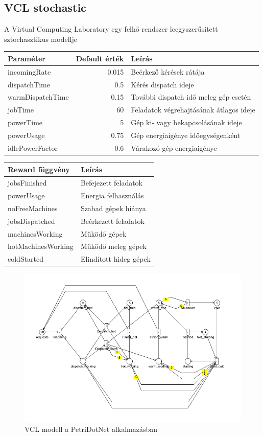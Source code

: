 \subsection{VCL stochastic}

A Virtual Computing Laboratory egy felhő rendszer leegyszerűsített sztochasztikus modellje
\begin{center}
	\begin{tabular}{lrl}
		\textbf{\textbf{Paraméter}} & \textbf{Default érték} & \textbf{Leírás} \\
		\hline
		incomingRate & 0.015 & Beérkező kérések rátája\\
		dispatchTime & 0.5 & Kérés dispatch ideje\\
		warmDispatchTime & 0.15 & További dispatch idő meleg gép esetén\\
		jobTime & 60 & Feladatok végrehajtásának átlagos ideje\\
		powerTime & 5 & Gép ki- vagy bekapcsolásának ideje\\
		powerUsage & 0.75 & Gép energiaigénye időegységenként\\
		idlePowerFactor & 0.6 & Várakozó gép energiaigénye\\
	\end{tabular}
	\quad
	\begin{tabular}{ll}
		\textbf{\textbf{Reward függvény}} & \textbf{Leírás}\\
		\hline
		jobsFinished & Befejezett feladatok\\
		powerUsage & Energia felhasználás\\
		noFreeMachines & Szabad gépek hiánya\\
		jobsDispatched & Beérkezett feladatok\\
		machinesWorking & Működő gépek\\
		hotMachinesWorking & Működő meleg gépek\\
		coldStarted & Elindított hideg gépek\\
	\end{tabular}
\end{center}

\begin{figure}
	\centering
	\includegraphics[width=140mm, keepaspectratio]{figures/vcl.png}
	\caption{VCL modell a PetriDotNet alkalmazásban}
\end{figure}

